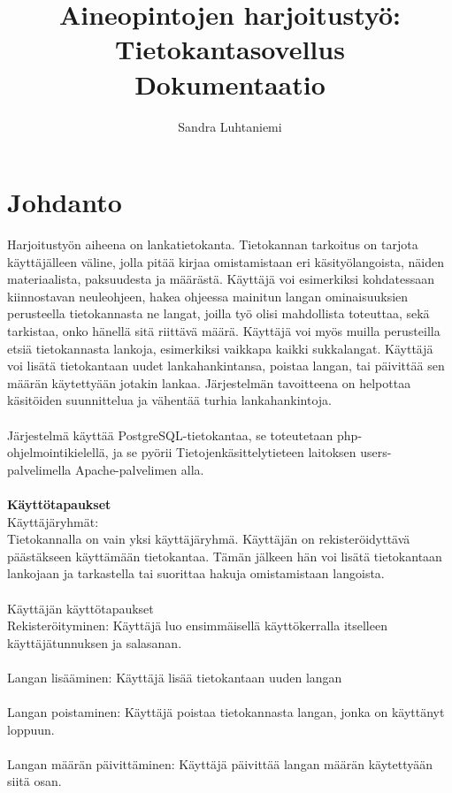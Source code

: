 \documentclass[12pt]{article}
\title{Aineopintojen harjoitustyö: Tietokantasovellus\\Dokumentaatio}
\author{Sandra Luhtaniemi}
\begin{document}
\maketitle
\section{Johdanto}
Harjoitustyön aiheena on lankatietokanta. Tietokannan tarkoitus on tarjota käyttäjälleen väline, jolla pitää kirjaa omistamistaan eri käsityölangoista, näiden materiaalista, paksuudesta ja määrästä. Käyttäjä voi esimerkiksi kohdatessaan kiinnostavan neuleohjeen, hakea ohjeessa mainitun langan ominaisuuksien perusteella tietokannasta ne langat, joilla työ olisi mahdollista toteuttaa, sekä tarkistaa, onko hänellä sitä riittävä määrä. Käyttäjä voi myös muilla perusteilla etsiä tietokannasta lankoja, esimerkiksi vaikkapa kaikki sukkalangat. Käyttäjä voi lisätä tietokantaan uudet lankahankintansa, poistaa langan, tai päivittää sen määrän käytettyään jotakin lankaa. Järjestelmän tavoitteena on helpottaa käsitöiden suunnittelua ja vähentää turhia lankahankintoja.
\\ \ \\
Järjestelmä käyttää PostgreSQL-tietokantaa, se toteutetaan php-ohjelmointikielellä, ja se pyörii Tietojenkäsittelytieteen laitoksen users-palvelimella Apache-palvelimen alla. 
\\
\ \\
\textbf{Käyttötapaukset}\\ 
Käyttäjäryhmät:\\
Tietokannalla on vain yksi käyttäjäryhmä. Käyttäjän on rekisteröidyttävä päästäkseen käyttämään tietokantaa. Tämän jälkeen hän voi lisätä tietokantaan lankojaan ja tarkastella tai suorittaa hakuja omistamistaan langoista. 
\\ \ \\
Käyttäjän käyttötapaukset\\
Rekisteröityminen: Käyttäjä luo ensimmäisellä käyttökerralla itselleen käyttäjätunnuksen ja salasanan.
\\ \ \\
Langan lisääminen: Käyttäjä lisää tietokantaan uuden langan
\\ \ \\
Langan poistaminen: Käyttäjä poistaa tietokannasta langan, jonka on käyttänyt loppuun.
\\ \ \\
Langan määrän päivittäminen: Käyttäjä päivittää langan määrän käytettyään siitä osan.
\\ \ \\
\end{document}
